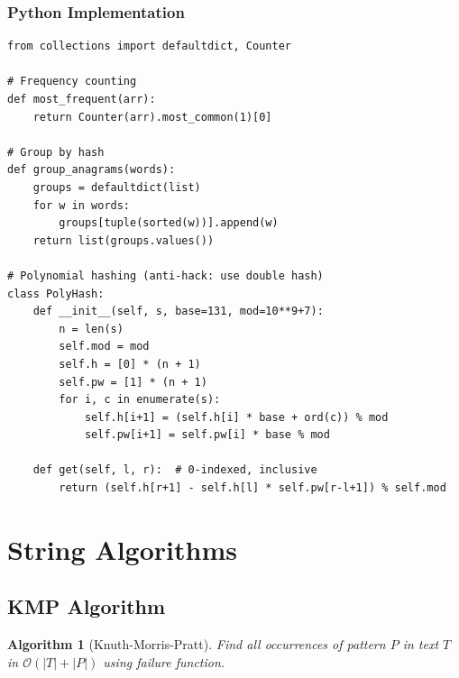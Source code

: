 \documentclass[10pt,a4paper]{article}
\theoremstyle{cpstyle}
\newtheorem{algorithm}[theorem]{Algorithm}
\newcommand{\bigO}[1]{\mathcal{O}\!\left(#1\right)}
\begin{document}
\subsubsection{Python Implementation}
\begin{lstlisting}[caption={Hashing patterns for competitive programming}]
from collections import defaultdict, Counter

# Frequency counting
def most_frequent(arr):
    return Counter(arr).most_common(1)[0]

# Group by hash
def group_anagrams(words):
    groups = defaultdict(list)
    for w in words:
        groups[tuple(sorted(w))].append(w)
    return list(groups.values())

# Polynomial hashing (anti-hack: use double hash)
class PolyHash:
    def __init__(self, s, base=131, mod=10**9+7):
        n = len(s)
        self.mod = mod
        self.h = [0] * (n + 1)
        self.pw = [1] * (n + 1)
        for i, c in enumerate(s):
            self.h[i+1] = (self.h[i] * base + ord(c)) % mod
            self.pw[i+1] = self.pw[i] * base % mod

    def get(self, l, r):  # 0-indexed, inclusive
        return (self.h[r+1] - self.h[l] * self.pw[r-l+1]) % self.mod
\end{lstlisting}

\clearpage
\section{String Algorithms}

\subsection{KMP Algorithm}

\begin{algorithm}[Knuth-Morris-Pratt]
Find all occurrences of pattern $P$ in text $T$ in $\bigO{|T|+|P|}$ using failure function.
\end{algorithm}
\end{document}
